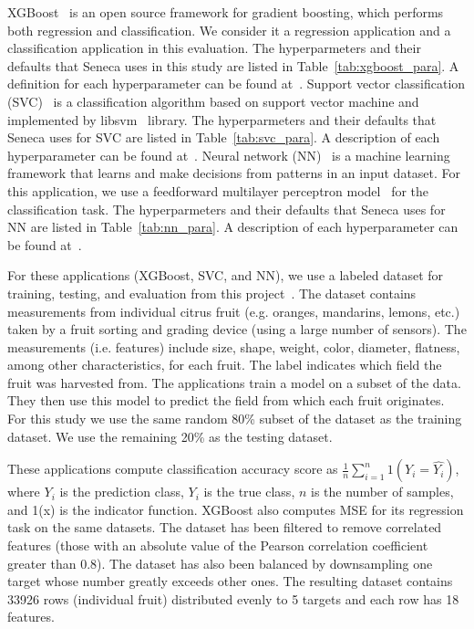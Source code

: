 XGBoost~\cite{ref:xgboost-web} is an open source framework for gradient boosting, which 
performs both regression and classification. We consider it a regression application and
a classification application in this evaluation.  
The hyperparmeters and their defaults that Seneca uses in this study are listed in Table~\ref{tab:xgboost_para}. A definition for each hyperparameter can be found at~\cite{xgboostparams}.
Support vector classification (SVC)~\cite{ref:svc} is a classification algorithm 
based on support vector machine and implemented by libsvm~\cite{ref:libsvm} library.
The hyperparmeters and their defaults that Seneca uses for SVC are listed in Table~\ref{tab:svc_para}. A description of each hyperparameter can be found at~\cite{xvcparams}.
Neural network (NN)~\cite{ref:neural_network} is a machine learning framework that learns 
and make decisions from patterns in an input dataset. For this application, 
we use a feedforward multilayer perceptron model~\cite{ref:feedforward_nn} 
for the classification task.
The hyperparmeters and their defaults that Seneca uses for NN are listed in Table~\ref{tab:nn_para}. A description of each hyperparameter can be found at~\cite{nnparams}.

For these applications (XGBoost, SVC, and NN), we use a labeled
dataset for training, testing, and evaluation from this
project~\cite{iot-cpu}. The dataset contains measurements from individual
citrus fruit (e.g. oranges, mandarins, lemons, etc.) taken by a fruit sorting
and grading device (using a large number of sensors).  The measurements (i.e.
features) include size, shape, weight, color, diameter, flatness, among other
characteristics, for each fruit.  The label indicates which field the fruit
was harvested from.  The applications train a model on a subset of the
data.  They then use this model to predict the field
from which each fruit originates. For this study we use the same random 80\%
subset of the dataset as the training dataset.  We use the remaining 20\% as the
testing dataset.

These applications compute classification accuracy score
as $\frac{1}{n}\sum_{i=1}^{n}1(Y_i = \hat{Y_i})$, where $Y_i$ is the
prediction class, $Y_i$ is the true class, $n$ is the number of samples, and 1(x)
is the indicator function. XGBoost also computes MSE for its regression task
on the same datasets. The dataset has been filtered to remove correlated
features (those with an absolute value of the Pearson correlation coefficient
greater than 0.8). The dataset has also been balanced by downsampling one
target whose number greatly exceeds other ones. The resulting dataset contains
33926 rows (individual fruit) distributed evenly to 5 targets and each row has
18 features.

